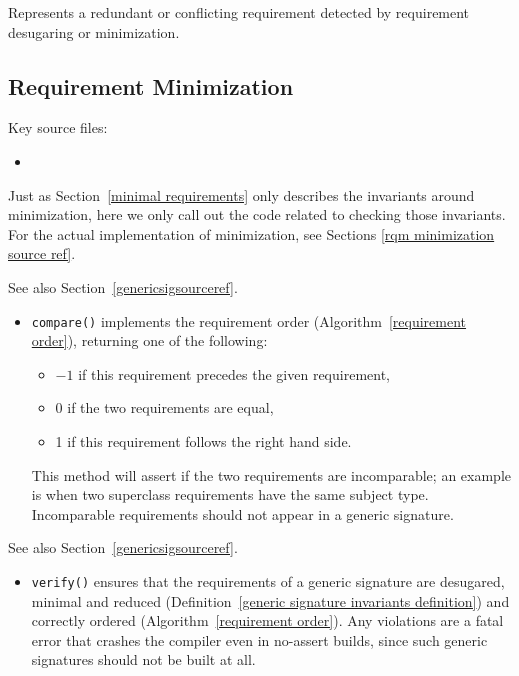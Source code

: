 \documentclass[../generics]{subfiles}
\begin{document}
Represents a redundant or conflicting requirement detected by requirement desugaring or minimization.

\subsection*{Requirement Minimization}

Key source files:
\begin{itemize}
\item {}
\end{itemize}
Just as Section~\ref{minimal requirements} only describes the invariants around minimization, here we only call out the code related to checking those invariants. For the actual implementation of minimization, see Sections \ref{rqm minimization source ref}.

See also Section~\ref{genericsigsourceref}.
\begin{itemize}
\item \texttt{compare()} implements the requirement order (Algorithm~\ref{requirement order}), returning one of the following:
\begin{itemize}
\item $-1$ if this requirement precedes the given requirement,
\item 0 if the two requirements are equal,
\item 1 if this requirement follows the right hand side.
\end{itemize}
This method will assert if the two requirements are incomparable; an example is when two superclass requirements have the same subject type. Incomparable requirements should not appear in a generic signature. 
\end{itemize}

See also Section~\ref{genericsigsourceref}.
\begin{itemize}
\item \texttt{verify()} ensures that the requirements of a generic signature are desugared, minimal and reduced (Definition~\ref{generic signature invariants definition}) and correctly ordered (Algorithm~\ref{requirement order}). Any violations are a fatal error that crashes the compiler even in no-assert builds, since such generic signatures should not be built at all.
\end{itemize}
\end{document}
